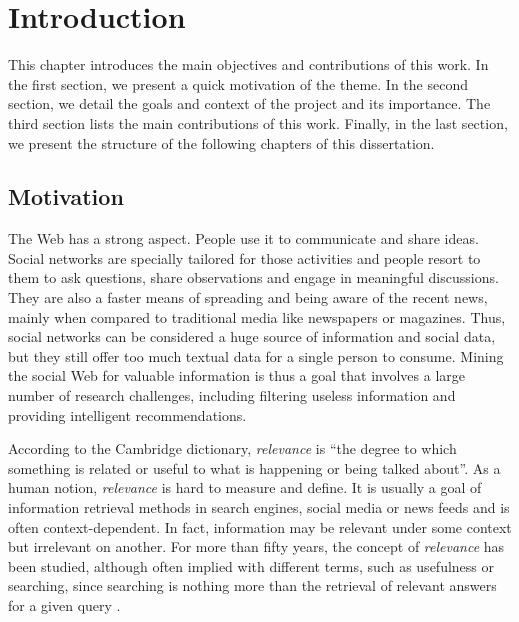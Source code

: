 
\chapter{Introduction} %

\label{intro} %

This chapter introduces the main objectives and contributions of this work. In the first section, we present a quick motivation of the theme. In the second section, we detail the goals and context of the project and its importance. The third section lists the main contributions of this work. Finally, in the last section, we present the structure of the following chapters of this dissertation.


\section{Motivation}
\label{sec:motivation}
The Web has a strong aspect. People use it to communicate and share ideas. Social networks are specially tailored for those activities and people resort to them to ask questions, share observations and engage in meaningful discussions. They are also a faster means of spreading and being aware of the recent news, mainly when compared to traditional media like newspapers or magazines. Thus, social networks can be considered a huge source of information and social data, but they still offer too much textual data for a single person to consume. Mining the social Web for valuable information is thus a goal that involves a large number of research challenges, including filtering useless information and providing intelligent recommendations.

According to the Cambridge dictionary, \textit{relevance} is ``the degree to which something is related or useful to what is happening or being talked about''. As a human notion, \textit{relevance} is hard to measure and define. It is usually a goal of information retrieval methods in search engines, social media or news feeds and is often context-dependent. In fact, information may be relevant under some context but irrelevant on another. For more than fifty years, the concept of \textit{relevance} has been studied, although often implied with different terms, such as usefulness or searching, since searching is nothing more than the retrieval of relevant answers for a given query \citep{Saracevic2015Relevance}.

